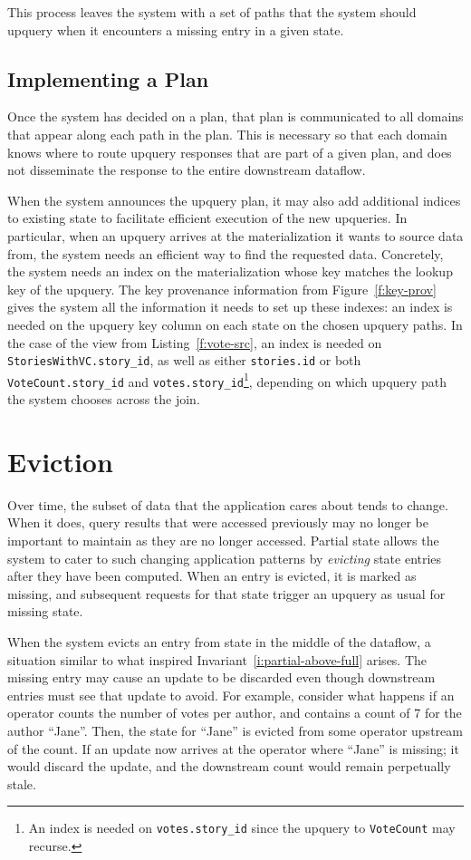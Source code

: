 This process leaves the system with a set of paths that the system should
upquery when it encounters a missing entry in a given state.

\subsection{Implementing a Plan}

Once the system has decided on a plan, that plan is communicated to all domains
that appear along each path in the plan. This is necessary so that each domain
knows where to route upquery responses that are part of a given plan, and does
not disseminate the response to the entire downstream dataflow.

When the system announces the upquery plan, it may also add additional indices
to existing state to facilitate efficient execution of the new upqueries. In
particular, when an upquery arrives at the materialization it wants to source
data from, the system needs an efficient way to find the requested data.
Concretely, the system needs an index on the materialization whose key matches
the lookup key of the upquery. The key provenance information from
Figure~\ref{f:key-prov} gives the system all the information it needs to set up
these indexes: an index is needed on the upquery key column on each state on the
chosen upquery paths. In the case of the view from Listing~\ref{f:vote-src}, an
index is needed on \texttt{StoriesWithVC.story\_id}, as well as either
\texttt{stories.id} or both \texttt{VoteCount.story\_id} and
\texttt{votes.story\_id}\footnote{An index is needed on \texttt{votes.story\_id}
since the upquery to \texttt{VoteCount} may recurse.}, depending on which
upquery path the system chooses across the join.

\section{Eviction}

Over time, the subset of data that the application cares about tends to change.
When it does, query results that were accessed previously may no longer be
important to maintain as they are no longer accessed. Partial state allows the
system to cater to such changing application patterns by \textit{evicting} state
entries after they have been computed. When an entry is evicted, it is marked as
missing, and subsequent requests for that state trigger an upquery as usual for
missing state.

When the system evicts an entry from state in the middle of the dataflow, a
situation similar to what inspired Invariant~\ref{i:partial-above-full} arises.
The missing entry may cause an update to be discarded even though downstream
entries must see that update to avoid. For example, consider what happens if an
operator counts the number of votes per author, and contains a count
of 7 for the author ``Jane''. Then, the state for ``Jane'' is evicted from some
operator upstream of the count. If an update now arrives at the operator where
``Jane'' is missing; it would discard the update, and the downstream count would
remain perpetually stale.

